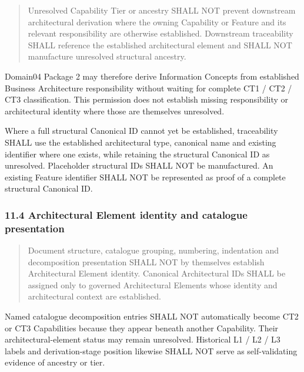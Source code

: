 \begin{quote}

Unresolved Capability Tier or ancestry SHALL NOT prevent downstream architectural derivation where the owning Capability or Feature and its relevant responsibility are otherwise established. Downstream traceability SHALL reference the established architectural element and SHALL NOT manufacture unresolved structural ancestry.


\end{quote}
\label{rad:k9:1432}

Domain04 Package 2 may therefore derive Information Concepts from established Business Architecture responsibility without waiting for complete CT1 /\allowbreak{} CT2 /\allowbreak{} CT3 classification. This permission does not establish missing responsibility or architectural identity where those are themselves unresolved.

\label{rad:k9:1434}

Where a full structural Canonical ID cannot yet be established, traceability SHALL use the established architectural type, canonical name and existing identifier where one exists, while retaining the structural Canonical ID as unresolved. Placeholder structural IDs SHALL NOT be manufactured. An existing Feature identifier SHALL NOT be represented as proof of a complete structural Canonical ID.

\label{rad:k9:1436}
\subsubsection*{11.4 Architectural Element identity and catalogue presentation}
\label{rad:k9:1438}

\begin{quote}

Document structure, catalogue grouping, numbering, indentation and decomposition presentation SHALL NOT by themselves establish Architectural Element identity. Canonical Architectural IDs SHALL be assigned only to governed Architectural Elements whose identity and architectural context are established.


\end{quote}
\label{rad:k9:1440}

Named catalogue decomposition entries SHALL NOT automatically become CT2 or CT3 Capabilities because they appear beneath another Capability. Their architectural-element status may remain unresolved. Historical L1 /\allowbreak{} L2 /\allowbreak{} L3 labels and derivation-stage position likewise SHALL NOT serve as self-validating evidence of ancestry or tier.

